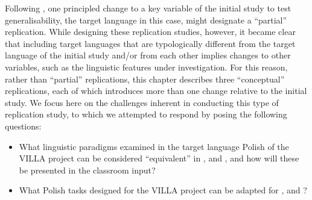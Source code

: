 \documentclass[output=paper,colorlinks,citecolor=brown,modfonts,nonflat]{../langscibook}
\begin{document}
Following \citet{MarsdenEtAl2018Replication}, one principled change to a key variable of the initial study to test generalisability, the target language in this case, might designate a “partial” replication. While designing these replication studies, however, it became clear that including target languages that are typologically different from the target language of the initial study and/or from each other implies changes to other variables, such as the linguistic features under investigation. For this reason, rather than “partial” replications, this chapter describes three “conceptual” replications, each of which introduces more than one change relative to the initial study. We focus here on the challenges inherent in conducting this type of replication study, to which we attempted to respond by posing the following questions: 

\begin{itemize}
\item What linguistic paradigms examined in the target language Polish of the VILLA project can be considered “equivalent” in ,  and , and how will these be presented in the classroom input?
\item What Polish tasks designed for the VILLA project can be adapted for ,  and ?
\end{itemize}
\end{document}
